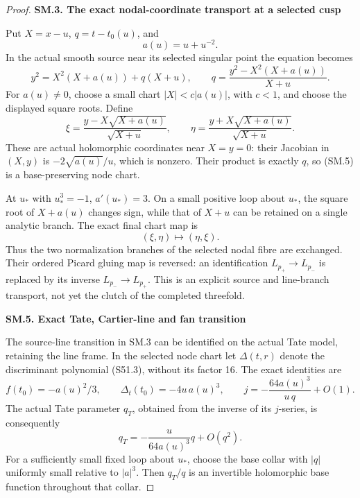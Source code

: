 \begin{proof}
\par

\medskip\noindent\textbf{SM.3. The exact nodal-coordinate transport at a selected cusp}

\par\nobreak

Put \(X=x-u\), \(q=t-t_0(u)\), and
\[
                         a(u)=u+u^{-2}.
\]
In the actual smooth source near its selected singular
point the equation becomes
\[
 y^2=X^2(X+a(u))+q(X+u),\qquad
 q=\frac{y^2-X^2(X+a(u))}{X+u}.
 \tag{SM.4}
\]
For \(a(u)\ne0\), choose a small chart
\(|X|<c|a(u)|\), with \(c<1\), and choose the displayed
square roots. Define
\[
 \xi=\frac{y-X\sqrt{X+a(u)}}{\sqrt{X+u}},\qquad
 \eta=\frac{y+X\sqrt{X+a(u)}}{\sqrt{X+u}}.
 \tag{SM.5}
\]
These are actual holomorphic coordinates near \(X=y=0\):
their Jacobian in \((X,y)\) is
\(-2\sqrt{a(u)}/u\), which is nonzero. Their product is
exactly \(q\), so (SM.5) is a base-preserving node chart.

At \(u_*\) with \(u_*^3=-1\), \(a'(u_*)=3\). On a small
positive loop about \(u_*\), the square root of \(X+a(u)\)
changes sign, while that of \(X+u\) can be retained on a
single analytic branch. The exact final chart map is
\[
                              (\xi,\eta)\longmapsto(\eta,\xi).
 \tag{SM.6}
\]
Thus the two normalization branches of the selected nodal
fibre are exchanged. Their ordered Picard gluing map is
reversed: an identification \(L_{p_+}\to L_{p_-}\) is
replaced by its inverse \(L_{p_-}\to L_{p_+}\). This is an
explicit source and line-branch transport, not yet the
clutch of the completed threefold.

\par

\medskip\noindent\textbf{SM.5. Exact Tate, Cartier-line and fan transition}

\par\nobreak

The source-line transition in SM.3 can be identified on the
actual Tate model, retaining the line frame. In the selected
node chart let \(\Delta(t,r)\) denote the discriminant
polynomial (S51.3), without its factor 16. The exact identities
are
\[
 f(t_0)=-a(u)^2/3,\qquad
 \Delta_t(t_0)=-4u\,a(u)^3,\qquad
 j=-\frac{64a(u)^3}{u\,q}+O(1).
 \tag{SM.7}
\]
The actual Tate parameter \(q_T\), obtained from the inverse
of its \(j\)-series, is consequently
\[
                q_T=-\frac{u}{64a(u)^3}q+O(q^2).
 \tag{SM.8}
\]
For a sufficiently small fixed loop about \(u_*\), choose the
base collar with \(|q|\) uniformly small relative to \(|a|^3\).
Then \(q_T/q\) is an invertible holomorphic base function
throughout that collar.


\end{proof}

